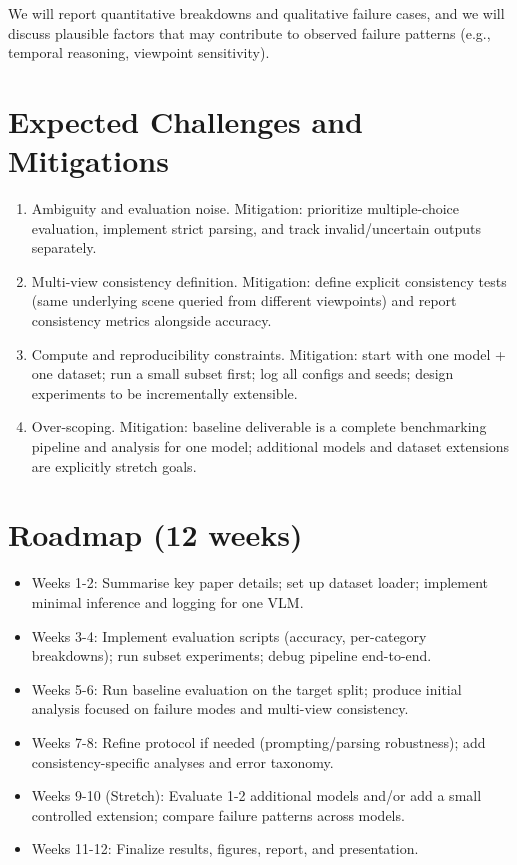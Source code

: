 \documentclass[10pt,twocolumn,letterpaper]{article}
\begin{document}
We will report quantitative breakdowns and qualitative failure cases, and we will discuss plausible factors that may contribute to observed failure patterns (e.g., temporal reasoning, viewpoint sensitivity).

\section{Expected Challenges and Mitigations}
\begin{enumerate}
  \item Ambiguity and evaluation noise.
Mitigation: prioritize multiple-choice evaluation, implement strict parsing, and track invalid/uncertain outputs separately.

 \item Multi-view consistency definition.
Mitigation: define explicit consistency tests (same underlying scene queried from different viewpoints) and report consistency metrics alongside accuracy.

 \item Compute and reproducibility constraints.
Mitigation: start with one model + one dataset; run a small subset first; log all configs and seeds; design experiments to be incrementally extensible.

 \item Over-scoping.
Mitigation: baseline deliverable is a complete benchmarking pipeline and analysis for one model; additional models and dataset extensions are explicitly stretch goals. 
\end{enumerate}

\section{Roadmap (12 weeks)}
\begin{itemize}
  \item Weeks 1-2: Summarise key paper details; set up dataset loader; implement minimal inference and logging for one VLM.
  \item Weeks 3-4: Implement evaluation scripts (accuracy, per-category breakdowns); run subset experiments; debug pipeline end-to-end.
  \item Weeks 5-6: Run baseline evaluation on the target split; produce initial analysis focused on failure modes and multi-view consistency.
  \item Weeks 7-8: Refine protocol if needed (prompting/parsing robustness); add consistency-specific analyses and error taxonomy.
  \item Weeks 9-10 (Stretch): Evaluate 1-2 additional models and/or add a small controlled extension; compare failure patterns across models.
  \item Weeks 11-12: Finalize results, figures, report, and presentation.
\end {itemize}
\end{document}
